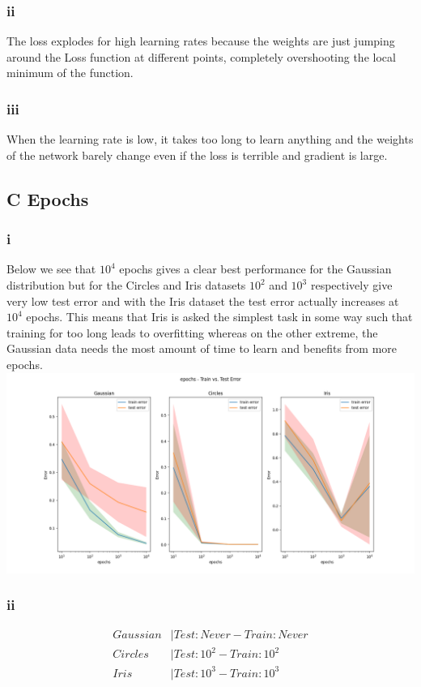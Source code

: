 \documentclass{article}
\begin{document}
\subsubsection{ii}
The loss explodes for high learning rates because the weights are just jumping around the Loss function at different points, completely overshooting the local minimum of the function.
\subsubsection{iii}
When the learning rate is low, it takes too long to learn anything and the weights of the network barely change even if the loss is terrible and gradient is large.
\subsection{C Epochs}
\subsubsection{i}
Below we see that $10^4$ epochs gives a clear best performance for the Gaussian distribution but for the Circles and Iris datasets $10^2$ and $10^3$ respectively give very low test error and with the Iris dataset the test error actually increases at $10^4$ epochs. This means that Iris is asked the simplest task in some way such that training for too long leads to overfitting whereas on the other extreme, the Gaussian data needs the most amount of time to learn and benefits from more epochs.\\
\includegraphics*[width=16cm]{epochs}
\subsubsection{ii}
\begin{align*}
Gaussian &| Test: Never - Train: Never \\
Circles &| Test: 10^2 - Train: 10^2 \\
Iris &| Test: 10^3 - Train: 10^3
\end{align*}
\end{document}
